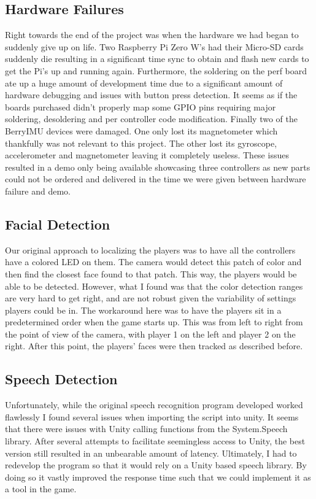 \documentclass[a4paper,10pt]{article}
\begin{document}
\subsection{Hardware Failures}
Right towards the end of the project was when the hardware we had began to suddenly give up on life. Two Raspberry Pi Zero W's had their Micro-SD cards suddenly die resulting in a significant time sync to obtain and flash new cards to get the Pi's up and running again. Furthermore, the soldering on the perf board ate up a huge amount of development time due to a significant amount of hardware debugging and issues with button press detection. It seems as if the boards purchased didn't properly map some GPIO pins requiring major soldering, desoldering and per controller code modification. Finally two of the BerryIMU devices were damaged. One only lost its magnetometer which thankfully was not relevant to this project. The other lost its gyroscope, accelerometer and magnetometer leaving it completely useless. These issues resulted in a demo only being available showcasing three controllers as new parts could not be ordered and delivered in the time we were given between hardware failure and demo.

\subsection{Facial Detection}
Our original approach to localizing the players was to have all the controllers have a colored LED on them. The camera would detect this patch of color and then find the closest face found to that patch. This way, the players would be able to be detected. However, what I found was that the color detection ranges are very hard to get right, and are not robust given the variability of settings players could be in. The workaround here was to have the players sit in a predetermined order when the game starts up. This was from left to right from the point of view of the camera, with player 1 on the left and player 2 on the right. After this point, the players' faces were then tracked as described before.

\subsection{Speech Detection}
Unfortunately, while the original speech recognition program developed worked flawlessly I found several issues when importing the script into unity. It seems that there were issues with Unity calling functions from the System.Speech library. After several attempts to facilitate seemingless access to Unity, the best version still resulted in an unbearable amount of latency. Ultimately, I had to redevelop the program so that it would rely on a Unity based speech library. By doing so it vastly improved the response time such that we could implement it as a tool in the game.
\end{document}
